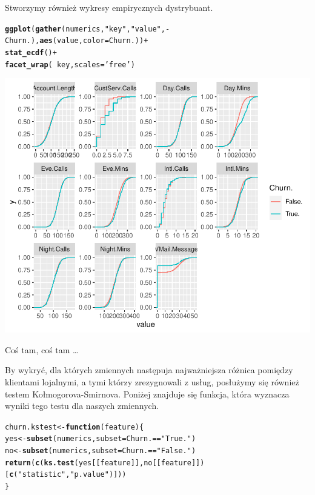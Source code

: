 \documentclass{article}\usepackage[]{graphicx}\usepackage[]{color}
\makeatletter
\def\maxwidth{ %
  \ifdim\Gin@nat@width>\linewidth
    \linewidth
  \else
    \Gin@nat@width
  \fi
}
\newcommand{\hlstr}[1]{\textcolor[rgb]{0.192,0.494,0.8}{#1}}%
\newcommand{\hlopt}[1]{\textcolor[rgb]{0,0,0}{#1}}%
\newcommand{\hlstd}[1]{\textcolor[rgb]{0.345,0.345,0.345}{#1}}%
\newcommand{\hlkwa}[1]{\textcolor[rgb]{0.161,0.373,0.58}{\textbf{#1}}}%
\newcommand{\hlkwb}[1]{\textcolor[rgb]{0.69,0.353,0.396}{#1}}%
\newcommand{\hlkwc}[1]{\textcolor[rgb]{0.333,0.667,0.333}{#1}}%
\newcommand{\hlkwd}[1]{\textcolor[rgb]{0.737,0.353,0.396}{\textbf{#1}}}%
\newenvironment{kframe}{%
 \def\at@end@of@kframe{}%
 \ifinner\ifhmode%
  \def\at@end@of@kframe{\end{minipage}}%
  \begin{minipage}{\columnwidth}%
 \fi\fi%
 \def\FrameCommand##1{\hskip\@totalleftmargin \hskip-\fboxsep
 \colorbox{shadecolor}{##1}\hskip-\fboxsep
     \hskip-\linewidth \hskip-\@totalleftmargin \hskip\columnwidth}%
 \MakeFramed {\advance\hsize-\width
   \@totalleftmargin\z@ \linewidth\hsize
   \@setminipage}}%
 {\par\unskip\endMakeFramed%
 \at@end@of@kframe}
\newenvironment{knitrout}{}{} %
\makeatother
\begin{document}
Stworzymy również wykresy empirycznych dystrybuant.
\begin{knitrout}
\color{fgcolor}\begin{kframe}
\begin{alltt}
\hlkwd{ggplot}\hlstd{(}\hlkwd{gather}\hlstd{(numerics,} \hlstr{"key"}\hlstd{,} \hlstr{"value"}\hlstd{,} \hlopt{-}\hlstd{Churn.),} \hlkwd{aes}\hlstd{(value,} \hlkwc{color}\hlstd{=Churn.))} \hlopt{+}
  \hlkwd{stat_ecdf}\hlstd{()} \hlopt{+}
  \hlkwd{facet_wrap}\hlstd{(}\hlopt{~}\hlstd{key,} \hlkwc{scales}\hlstd{=}\hlstr{'free'}\hlstd{)}
\end{alltt}
\end{kframe}

{\centering \includegraphics[width=\maxwidth]{figure/Ecdf-1} 

}



\end{knitrout}
Coś tam, coś tam \ldots

By wykryć, dla których zmiennych następuja najważniejsza różnica pomiędzy klientami lojalnymi, a tymi którzy zrezygnowali z usług, posłużymy się również testem Kołmogorova-Smirnova. Poniżej znajduje się funkcja, która wyznacza wyniki tego testu dla naszych zmiennych. 
\begin{knitrout}
\color{fgcolor}\begin{kframe}
\begin{alltt}
\hlstd{churn.kstest} \hlkwb{<-} \hlkwa{function}\hlstd{(}\hlkwc{feature}\hlstd{) \{}
  \hlstd{yes} \hlkwb{<-} \hlkwd{subset}\hlstd{(numerics,} \hlkwc{subset}\hlstd{=Churn.}\hlopt{==}\hlstr{"True."}\hlstd{)}
  \hlstd{no} \hlkwb{<-} \hlkwd{subset}\hlstd{(numerics,} \hlkwc{subset}\hlstd{=Churn.}\hlopt{==}\hlstr{"False."}\hlstd{)}
  \hlkwd{return}\hlstd{(}\hlkwd{c}\hlstd{(}\hlkwd{ks.test}\hlstd{(yes[[feature]], no[[feature]])[}\hlkwd{c}\hlstd{(}\hlstr{"statistic"}\hlstd{,} \hlstr{"p.value"}\hlstd{)]))}
\hlstd{\}}
\end{alltt}
\end{kframe}
\end{knitrout}
\end{document}
